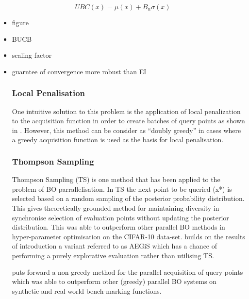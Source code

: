 \documentclass{article}
\begin{document}
			\begin{equation}\label{eq:UCB1} UBC(x) = \mu(x) + B_n\sigma(x) \end{equation}


			\begin{itemize}

				\item figure

				\item BUCB

				\item scaling factor

				\item guarntee of convergence more robust than EI


		\subsubsection{Local Penalisation}

			One intuitive solution to this problem is the application of local penalization to the acquisition function in order to create batches of query points as shown in \cite{37}. However, this method can be consider as “doubly greedy” \cite{36} in cases where a greedy acquisition function is used as the basis for local penalisation.




		\subsubsection{Thompson Sampling}

			Thompson Sampling (TS) is one method that has been applied to the problem of BO parrallelisation\cite{26}\cite{27}. In TS the next point to be queried (x*) is selected based on a random sampling of the posterior probability distribution. This gives theoretically grounded method for maintaining diversity in synchronise selection of evaluation points without updating the posterior distribution. This was able to outperform other parallel BO methods in hyper-parameter optimisation on the CIFAR-10 data-set. 
			\cite{26} builds on the results of \cite{27} introduction a variant referred to as AEGiS which has a chance of performing a purely explorative evaluation rather than utilising TS.

			 \cite{36} puts forward a non greedy method for the parallel acquisition of query points which was able to outperform other (greedy) parallel BO systems on synthetic and real world bench-marking functions.





\end{itemize}
\end{document}
